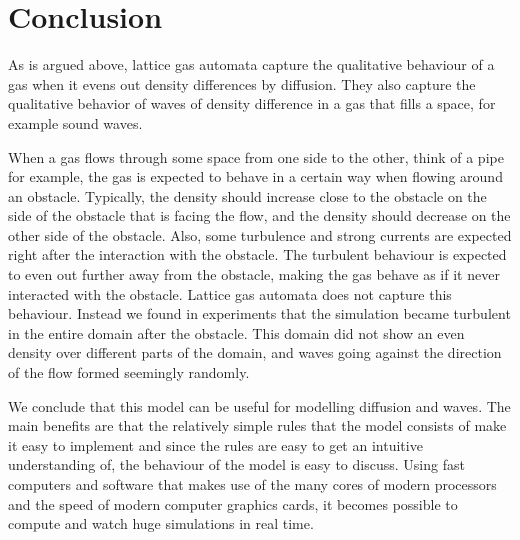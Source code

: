 \documentclass[12pt,a4paper]{article}
\begin{document}
\section{Conclusion}
\label{sec:conclusion}
As is argued above, lattice gas automata capture the qualitative behaviour of a gas when it evens out density differences by diffusion. They also capture the qualitative behavior of waves of density difference in a gas that fills a space, for example sound waves.

When a gas flows through some space from one side to the other, think of a pipe for example, the gas is expected to behave in a certain way when flowing around an obstacle. Typically, the density should increase close to the obstacle on the side of the obstacle that is facing the flow, and the density should decrease on the other side of the obstacle. Also, some turbulence and strong currents are expected right after the interaction with the obstacle. The turbulent behaviour is expected to even out further away from the obstacle, making the gas behave as if it never interacted with the obstacle. Lattice gas automata does not capture this behaviour. Instead we found in experiments that the simulation became turbulent in the entire domain after the obstacle. This domain did not show an even density over different parts of the domain, and waves going against the direction of the flow formed seemingly randomly.

We conclude that this model can be useful for modelling diffusion and waves. The main benefits are that the relatively simple rules that the model consists of make it easy to implement and since the rules are easy to get an intuitive understanding of, the behaviour of the model is easy to discuss. Using fast computers and software that makes use of the many cores of modern processors and the speed of modern computer graphics cards, it becomes possible to compute and watch huge simulations in real time.
\end{document}
